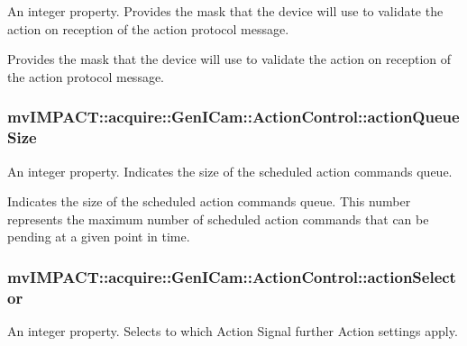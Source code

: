 An integer property. Provides the mask that the device will use to validate the action on reception of the action protocol message. 

Provides the mask that the device will use to validate the action on reception of the action protocol message. \hypertarget{classmv_i_m_p_a_c_t_1_1acquire_1_1_gen_i_cam_1_1_action_control_a7936345c8ca15b298a749b1410e1fa35}{
\subsubsection[{action\+Queue\+Size}]{ mv\+I\+M\+P\+A\+C\+T\+::acquire\+::\+Gen\+I\+Cam\+::\+Action\+Control\+::action\+Queue\+Size}}\label{classmv_i_m_p_a_c_t_1_1acquire_1_1_gen_i_cam_1_1_action_control_a7936345c8ca15b298a749b1410e1fa35}


An integer property. Indicates the size of the scheduled action commands queue. 

Indicates the size of the scheduled action commands queue. This number represents the maximum number of scheduled action commands that can be pending at a given point in time. \hypertarget{classmv_i_m_p_a_c_t_1_1acquire_1_1_gen_i_cam_1_1_action_control_ac5e7271633d0a2566ed8980db4d3a3b1}{
\subsubsection[{action\+Selector}]{ mv\+I\+M\+P\+A\+C\+T\+::acquire\+::\+Gen\+I\+Cam\+::\+Action\+Control\+::action\+Selector}}\label{classmv_i_m_p_a_c_t_1_1acquire_1_1_gen_i_cam_1_1_action_control_ac5e7271633d0a2566ed8980db4d3a3b1}


An integer property. Selects to which Action Signal further Action settings apply. 

